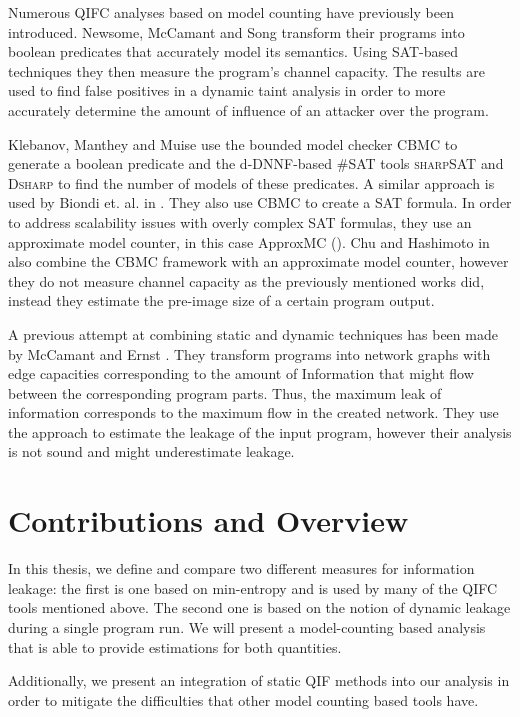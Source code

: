 Numerous QIFC analyses based on model counting have previously been introduced.
Newsome, McCamant and Song \cite{newsome09} transform their programs into boolean predicates that accurately model its semantics. Using SAT-based techniques they then measure the program's channel capacity. The results are used to find false positives in a dynamic taint analysis in order to more accurately determine the amount of influence of an attacker over the program. 

Klebanov, Manthey and Muise \cite{klebanov13} use the bounded model checker CBMC \cite{cbmc} to generate a boolean predicate and the d-DNNF-based \#SAT tools \textsc{sharp}SAT \cite{thurley06} and \textsc{Dsharp} \cite{muise12} to find the number of models of these predicates. A similar approach is used by Biondi et. al. in \cite{biondi18}. They also use CBMC to create a SAT formula. In order to address scalability issues with overly complex SAT formulas, they use an approximate model counter, in this case ApproxMC (\cite{chakraborty13}). Chu and Hashimoto in \cite{chu19} also combine the CBMC framework with an approximate model counter, however they do not measure channel capacity as the previously mentioned works did, instead they estimate the pre-image size of a certain program output.

A previous attempt at combining static and dynamic techniques has been made by McCamant and Ernst \cite{mccamant08}. They transform programs into network graphs with edge capacities corresponding to the amount of Information that might flow between the corresponding program parts. Thus, the maximum leak of information corresponds to the maximum flow in the created network. They use the approach to estimate the leakage of the input program, however their analysis is not sound and might underestimate leakage.


\section{Contributions and Overview}
In this thesis, we define and compare two different measures for information leakage: the first is one based on min-entropy and is used by many of the QIFC tools mentioned above. The second one is based on the notion of dynamic leakage during a single program run. We will present a model-counting based analysis that is able to provide estimations for both quantities.

Additionally, we present an integration of static QIF methods into our analysis in order to mitigate the difficulties that other model counting based tools have.

